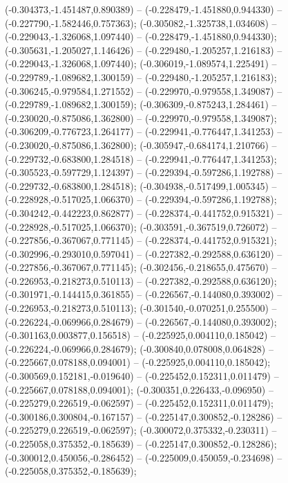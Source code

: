  (-0.304373,-1.451487,0.890389) -- (-0.228479,-1.451880,0.944330) -- (-0.227790,-1.582446,0.757363);
 (-0.305082,-1.325738,1.034608) -- (-0.229043,-1.326068,1.097440) -- (-0.228479,-1.451880,0.944330);
 (-0.305631,-1.205027,1.146426) -- (-0.229480,-1.205257,1.216183) -- (-0.229043,-1.326068,1.097440);
 (-0.306019,-1.089574,1.225491) -- (-0.229789,-1.089682,1.300159) -- (-0.229480,-1.205257,1.216183);
 (-0.306245,-0.979584,1.271552) -- (-0.229970,-0.979558,1.349087) -- (-0.229789,-1.089682,1.300159);
 (-0.306309,-0.875243,1.284461) -- (-0.230020,-0.875086,1.362800) -- (-0.229970,-0.979558,1.349087);
 (-0.306209,-0.776723,1.264177) -- (-0.229941,-0.776447,1.341253) -- (-0.230020,-0.875086,1.362800);
 (-0.305947,-0.684174,1.210766) -- (-0.229732,-0.683800,1.284518) -- (-0.229941,-0.776447,1.341253);
 (-0.305523,-0.597729,1.124397) -- (-0.229394,-0.597286,1.192788) -- (-0.229732,-0.683800,1.284518);
 (-0.304938,-0.517499,1.005345) -- (-0.228928,-0.517025,1.066370) -- (-0.229394,-0.597286,1.192788);
 (-0.304242,-0.442223,0.862877) -- (-0.228374,-0.441752,0.915321) -- (-0.228928,-0.517025,1.066370);
 (-0.303591,-0.367519,0.726072) -- (-0.227856,-0.367067,0.771145) -- (-0.228374,-0.441752,0.915321);
 (-0.302996,-0.293010,0.597041) -- (-0.227382,-0.292588,0.636120) -- (-0.227856,-0.367067,0.771145);
 (-0.302456,-0.218655,0.475670) -- (-0.226953,-0.218273,0.510113) -- (-0.227382,-0.292588,0.636120);
 (-0.301971,-0.144415,0.361855) -- (-0.226567,-0.144080,0.393002) -- (-0.226953,-0.218273,0.510113);
 (-0.301540,-0.070251,0.255500) -- (-0.226224,-0.069966,0.284679) -- (-0.226567,-0.144080,0.393002);
 (-0.301163,0.003877,0.156518) -- (-0.225925,0.004110,0.185042) -- (-0.226224,-0.069966,0.284679);
 (-0.300840,0.078008,0.064828) -- (-0.225667,0.078188,0.094001) -- (-0.225925,0.004110,0.185042);
 (-0.300569,0.152181,-0.019640) -- (-0.225452,0.152311,0.011479) -- (-0.225667,0.078188,0.094001);
 (-0.300351,0.226433,-0.096950) -- (-0.225279,0.226519,-0.062597) -- (-0.225452,0.152311,0.011479);
 (-0.300186,0.300804,-0.167157) -- (-0.225147,0.300852,-0.128286) -- (-0.225279,0.226519,-0.062597);
 (-0.300072,0.375332,-0.230311) -- (-0.225058,0.375352,-0.185639) -- (-0.225147,0.300852,-0.128286);
 (-0.300012,0.450056,-0.286452) -- (-0.225009,0.450059,-0.234698) -- (-0.225058,0.375352,-0.185639);
